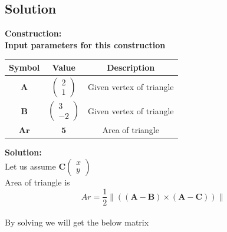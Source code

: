 \documentclass[10pt,a4paper]{report}
\newcommand{\myvec}[1]{\ensuremath{\begin{pmatrix}#1\end{pmatrix}}}
\providecommand{\norm}[1]{\left\lVert#1\right\rVert}
\let\vec\mathbf
\begin{document}
\begin{multicols}{2}
\section*{Solution}
\textbf{Construction: }\\
\textbf{Input parameters for this construction}
\begin{center}
\begin{tabular}{|c|c|c|}
\hline
\textbf{Symbol}&{Value}&{Description}\\
\hline
$\vec{A}$&$\myvec{2 \\ 1}$&Given vertex of triangle\\
\hline
$\vec{B}$&$\myvec{3 \\ -2}$&Given vertex of triangle\\
\hline
$\vec{Ar}$&$\vec{5}$&Area of triangle\\
\hline
\end{tabular}
\end{center}
\textbf{  Solution:}\\
Let us assume $\vec{C}\myvec{x \\ y}$\\
\vspace{0.25cm}
Area of triangle is \\
 \begin{equation}
Ar=\frac{1}{2}\norm{(\vec{(A-B)}\times\vec{(A-C)})}
\end{equation}
\\   %
By solving we will get the below matrix \\
		  

\end{multicols}
\end{document}
